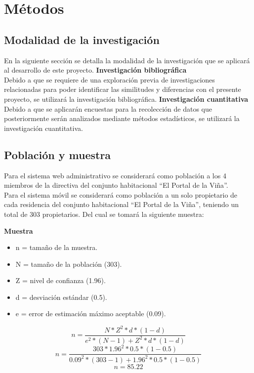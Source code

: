 \section{Métodos}
\subsection{Modalidad de la investigación}
En la siguiente sección se detalla la modalidad de la investigación que se aplicará al desarrollo de este proyecto.
\bigbreak
\textbf{Investigación bibliográfica} \\
Debido a que se requiere de una exploración previa de investigaciones relacionadas para poder identificar las similitudes y diferencias con el presente proyecto, se utilizará la investigación bibliográfica.
\bigbreak
\textbf{Investigación cuantitativa} \\
Debido a que se aplicarán encuestas para la recolección de datos que posteriormente serán analizados mediante métodos estadísticos, se utilizará la investigación cuantitativa.

\subsection{Población y muestra}\label{subsec:poblacion}

Para el sistema web administrativo se considerará como población a los 4 miembros de la directiva del conjunto habitacional {\textquotedblleft}El Portal de la Viña{\textquotedblright}.\\

Para el sistema móvil se considerará como población a un solo propietario de cada residencia del conjunto habitacional {\textquotedblleft}El Portal de la Viña{\textquotedblright}, teniendo un total de 303 propietarios. Del cual se tomará la siguiente muestra:

\bigbreak
\textbf{Muestra}
\begin{itemize}
    \item n = tamaño de la muestra.
    \item N = tamaño de la población (303).
    \item Z = nivel de confianza (1.96).
    \item d = desviación estándar (0.5).
    \item e = error de estimación máximo aceptable (0.09).
\end{itemize}
\begin{equation}
    \label{eq:equation}
    n = \frac{N * Z^2 * d * (1-d)}{e^2 * (N-1) + Z^2 * d * (1-d)}
\end{equation}
\begin{equation}
    \label{eq:equation1}
    n = \frac{303 * 1.96^2 * 0.5 * (1-0.5)}{0.09^2 * (303-1) + 1.96^2 * 0.5 * (1-0.5)}
\end{equation}
\begin{equation}
    \label{eq:equation2}
    n = 85.22
\end{equation}

